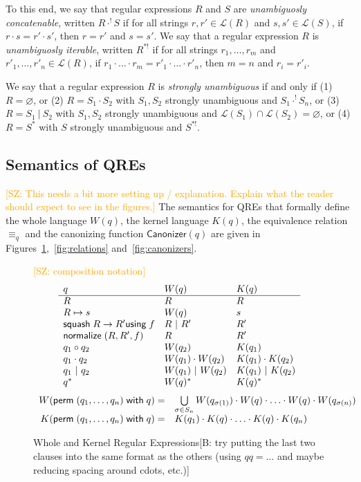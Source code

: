 \documentclass{svproc}
\newcommand{\FINISH}[3]{\ifdraft\textcolor{#1}{[#2: #3]}\fi}
\newcommand{\bcp}[1]{\FINISH{dkred}{B}{#1}}
\newcommand{\saz}[1]{\FINISH{orange}{SZ}{#1}}
\newcommand{\kw}[1]{\ensuremath{\mathsf{#1}}}
\newcommand{\squash}[3]{\ensuremath{\kw{squash} \; #1 \rightarrow #2
\kw{using} \; #3}}
\newcommand{\perm}[2]{\ensuremath{\kw{perm}\; (#1)\; \kw{with}\; #2}}
\newcommand{\normalize}[3]{\ensuremath{\kw{normalize} \; (#1, #2, #3)}}
\newcommand{\sep}{\ensuremath{\ | \ }}
\newcommand{\canonizer}{\ensuremath{\kw{Canonizer}}}
\newcommand{\eqrel}[1]{\ensuremath{\equiv_{#1}}}
\begin{document}
To this end, we say that regular expressions $R$ and $S$ are
\textit{unambiguosly concatenable}, written $R \cdot^! S$ if for all strings
$r, r' \in \mathcal{L}(R)$ and $s, s' \in \mathcal{L}(S)$, if $r \cdot s = r'
\cdot s'$, then $r = r'$ and $s = s'$. We say that a regular expression $R$ is
\textit{unambiguosly iterable}, written $R^{*!}$ if for all strings $r_1,
\ldots, r_m$ and $r'_1, \ldots, r'_n \in \mathcal{L}(R)$, if $r_1 \cdot \ldots
\cdot r_m = r'_1 \cdot \ldots \cdot r'_n$, then $m = n$ and $r_i = r'_i$.

We say that a regular expression $R$ is \textit{strongly unambiguous} if and
only if (1) $R = \varnothing$, or (2) $R = S_1 \cdot S_2$ with $S_1, S_2$
strongly unambiguous and $S_1 \cdot^! S_n$, or (3) $R = S_1 \sep S_2$ with
$S_1, S_2$ strongly unambiguous and $\mathcal{L}(S_1) \cap \mathcal{L}(S_2) =
\varnothing$, or (4) $R = S^*$ with $S$ strongly unambiguous and $S^{*!}$.

\subsection{Semantics of QREs}

\saz{This needs a bit more setting up / explanation. Explain what the reader
  should expect to see in the figures.}
The semantics for QREs that formally define the whole language $W(q)$, the
kernel language $K(q)$, the equivalence relation $\eqrel{q}$ and the
canonizing function $\canonizer(q)$ are given in
Figures~\ref{fig:wk},~\ref{fig:relations} and~\ref{fig:canonizers}.
\begin{figure}[t]
\saz{composition notation}
  \centering
  \[
    \begin{array}{l@{\quad}l@{\quad}l}
   
      q & W(q) & K(q) \\ \hline
      R & R & R \\
      R \mapsto s & W(q) & s \\
      \squash{R}{R'}{f} & R \sep R' & R' \\
      \normalize{R}{R'}{f} & R & R' \\
      q_1 \circ  q_2 & W(q_2) & K(q_1) \\
      q_1 \cdot q_2 & W(q_1) \cdot W(q_2) & K(q_1) \cdot K(q_2) \\
      q_1 \sep q_2 & W(q_1) \sep W(q_2) & K(q_1) \sep K(q_2) \\
      q^* & W(q)^* & K(q)^* \\
    \end{array}
  \]
\[
\begin{array}{r@{\quad}l}
W( \perm{q_1, \ldots, q_n}{q} ) = &
\bigcup \limits_{\sigma \in S_n} W(q_{\sigma(1)}) \cdot W(q) \cdot \ldots \cdot
W(q) \cdot W(q_{\sigma(n)})
\\
K( \perm{q_1, \ldots, q_n}{q} ) = &
 K(q_1) \cdot K(q) \cdot \ldots \cdot K(q) \cdot K(q_n) 
\end{array}
\]
  \caption{Whole and Kernel Regular Expressions\bcp{try putting the 
      last two clauses into the same format as the
      others (using $\mathit{qq} = ...$ and maybe reducing spacing around
      cdots, etc.)}}
  \label{fig:wk}
\end{figure}
\end{document}
